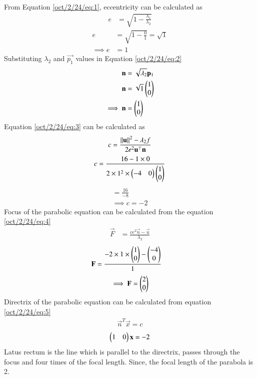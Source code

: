 From Equation \ref{oct/2/24/eq:1}, eccentricity can be calculated as
\begin{align}
    e&= \sqrt{1-\frac{\lambda_1}{\lambda_2}}
\end{align}
\begin{align}
    e&= \sqrt{1-\frac{0}{1}} =\sqrt{1}\\
     \implies e&= 1
\end{align}
Substituting $\lambda_2$ and $\vec{p_1}$ values in Equation {\ref{oct/2/24/eq:2}}
\begin{align}
   \mathbf{n}&= \sqrt{\lambda_2}\mathbf{p}_1\\
   \mathbf{n}&= \sqrt{1}\begin{pmatrix}1\\0\end{pmatrix}\\
   \implies \mathbf{n}&=\begin{pmatrix}1\\0\end{pmatrix}
\end{align}
Equation \ref{oct/2/24/eq:3} can be calculated as
\begin{align}
    c = \frac{\left\lVert\mathbf{u}\right\rVert^2 - \lambda_2 f   }{2e^2\mathbf{u}^{\top}\mathbf{n}}
\end{align}
\begin{align}
    c = \frac{16-1\times0}{2 \times 1^2 \times \begin{pmatrix}-4&0\end{pmatrix}\begin{pmatrix}1\\0\end{pmatrix}}
\end{align}
\begin{align}
    =\frac{16}{-8}\\
    \implies c = -2
\end{align}
Focus of the parabolic equation can be calculated from the equation \ref{oct/2/24/eq:4} 
 \begin{align}
  \vec{F}  &= \frac{ce^2\vec{n}-\vec{u}}{\lambda_2}
\end{align}
 \begin{align}
  \mathbf{F}  &= \frac{-2 \times 1 \times \begin{pmatrix}1\\0\end{pmatrix}-\begin{pmatrix}-4\\0\end{pmatrix}}{1}
\end{align}
\begin{align}
   \implies \mathbf{F}=\begin{pmatrix}2\\0\end{pmatrix} 
\end{align}
Directrix of the parabolic equation can be calculated from equation \ref{oct/2/24/eq:5}
\begin{align}
   \vec{n}^T \vec{x}=c 
\end{align}
\begin{align}
    \begin{pmatrix}1&0\end{pmatrix}\mathbf{x}=-2
\end{align}
Latus rectum is the line which is parallel to the directrix, passes through the focus and four times of the focal length. Since, the focal length of the parabola is 2.\\
